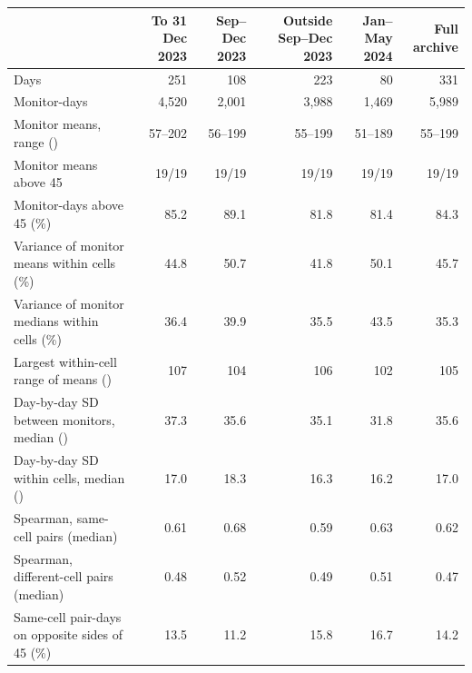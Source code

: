 \begin{tabular}{lrrrrr}\toprule
 & To 31 Dec 2023 & Sep--Dec 2023 & Outside Sep--Dec 2023 & Jan--May 2024 & Full archive \\ \midrule
Days & 251 & 108 & 223 & 80 & 331 \\
Monitor-days & 4{,}520 & 2{,}001 & 3{,}988 & 1{,}469 & 5{,}989 \\
Monitor means, range (\ugm{}) & 57--202 & 56--199 & 55--199 & 51--189 & 55--199 \\
Monitor means above 45 & 19/19 & 19/19 & 19/19 & 19/19 & 19/19 \\
Monitor-days above 45 (\%) & 85.2 & 89.1 & 81.8 & 81.4 & 84.3 \\
Variance of monitor means within cells (\%) & 44.8 & 50.7 & 41.8 & 50.1 & 45.7 \\
Variance of monitor medians within cells (\%) & 36.4 & 39.9 & 35.5 & 43.5 & 35.3 \\
Largest within-cell range of means (\ugm{}) & 107 & 104 & 106 & 102 & 105 \\
Day-by-day SD between monitors, median (\ugm{}) & 37.3 & 35.6 & 35.1 & 31.8 & 35.6 \\
Day-by-day SD within cells, median (\ugm{}) & 17.0 & 18.3 & 16.3 & 16.2 & 17.0 \\
Spearman, same-cell pairs (median) & 0.61 & 0.68 & 0.59 & 0.63 & 0.62 \\
Spearman, different-cell pairs (median) & 0.48 & 0.52 & 0.49 & 0.51 & 0.47 \\
Same-cell pair-days on opposite sides of 45 (\%) & 13.5 & 11.2 & 15.8 & 16.7 & 14.2 \\
\bottomrule\end{tabular}
